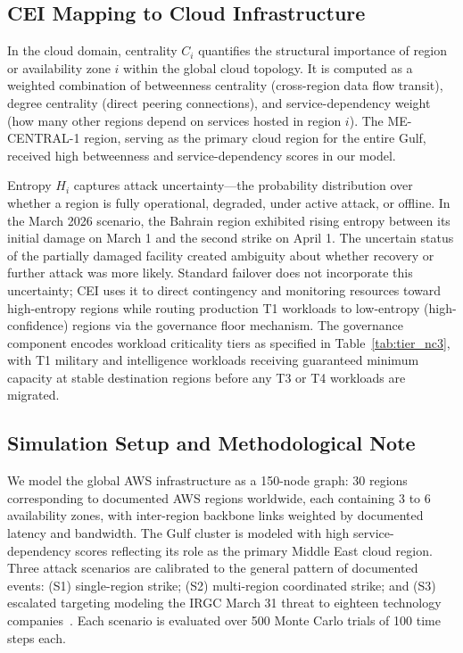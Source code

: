 \documentclass[runningheads]{llncs}
\begin{document}
\subsection{CEI Mapping to Cloud Infrastructure}

In the cloud domain, centrality $C_i$ quantifies the structural importance of region or availability zone $i$ within the global cloud topology. It is computed as a weighted combination of betweenness centrality (cross-region data flow transit), degree centrality (direct peering connections), and service-dependency weight (how many other regions depend on services hosted in region $i$). The ME-CENTRAL-1 region, serving as the primary cloud region for the entire Gulf, received high betweenness and service-dependency scores in our model.

Entropy $H_i$ captures attack uncertainty---the probability distribution over whether a region is fully operational, degraded, under active attack, or offline. In the March 2026 scenario, the Bahrain region exhibited rising entropy between its initial damage on March 1 and the second strike on April 1. The uncertain status of the partially damaged facility created ambiguity about whether recovery or further attack was more likely. Standard failover does not incorporate this uncertainty; CEI uses it to direct contingency and monitoring resources toward high-entropy regions while routing production T1 workloads to low-entropy (high-confidence) regions via the governance floor mechanism. The governance component encodes workload criticality tiers as specified in Table~\ref{tab:tier_nc3}, with T1 military and intelligence workloads receiving guaranteed minimum capacity at stable destination regions before any T3 or T4 workloads are migrated.

\subsection{Simulation Setup and Methodological Note}

We model the global AWS infrastructure as a 150-node graph: 30 regions corresponding to documented AWS regions worldwide, each containing 3 to 6 availability zones, with inter-region backbone links weighted by documented latency and bandwidth. The Gulf cluster is modeled with high service-dependency scores reflecting its role as the primary Middle East cloud region. Three attack scenarios are calibrated to the general pattern of documented events: (S1) single-region strike; (S2) multi-region coordinated strike; and (S3) escalated targeting modeling the IRGC March 31 threat to eighteen technology companies~\cite{conversation}. Each scenario is evaluated over 500 Monte Carlo trials of 100 time steps each.
\end{document}
